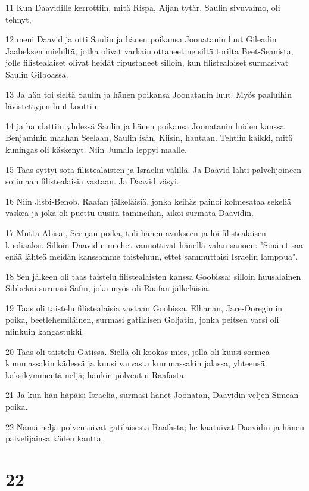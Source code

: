 \par 11 Kun Daavidille kerrottiin, mitä Rispa, Aijan tytär, Saulin sivuvaimo, oli tehnyt,
\par 12 meni Daavid ja otti Saulin ja hänen poikansa Joonatanin luut Gileadin Jaabeksen miehiltä, jotka olivat varkain ottaneet ne siltä torilta Beet-Seanista, jolle filistealaiset olivat heidät ripustaneet silloin, kun filistealaiset surmasivat Saulin Gilboassa.
\par 13 Ja hän toi sieltä Saulin ja hänen poikansa Joonatanin luut. Myös paaluihin lävistettyjen luut koottiin
\par 14 ja haudattiin yhdessä Saulin ja hänen poikansa Joonatanin luiden kanssa Benjaminin maahan Seelaan, Saulin isän, Kiisin, hautaan. Tehtiin kaikki, mitä kuningas oli käskenyt. Niin Jumala leppyi maalle.
\par 15 Taas syttyi sota filistealaisten ja Israelin välillä. Ja Daavid lähti palvelijoineen sotimaan filistealaisia vastaan. Ja Daavid väsyi.
\par 16 Niin Jisbi-Benob, Raafan jälkeläisiä, jonka keihäs painoi kolmesataa sekeliä vaskea ja joka oli puettu uusiin tamineihin, aikoi surmata Daavidin.
\par 17 Mutta Abisai, Serujan poika, tuli hänen avukseen ja löi filistealaisen kuoliaaksi. Silloin Daavidin miehet vannottivat hänellä valan sanoen: "Sinä et saa enää lähteä meidän kanssamme taisteluun, ettet sammuttaisi Israelin lamppua".
\par 18 Sen jälkeen oli taas taistelu filistealaisten kanssa Goobissa: silloin huusalainen Sibbekai surmasi Safin, joka myös oli Raafan jälkeläisiä.
\par 19 Taas oli taistelu filistealaisia vastaan Goobissa. Elhanan, Jare-Ooregimin poika, beetlehemiläinen, surmasi gatilaisen Goljatin, jonka peitsen varsi oli niinkuin kangastukki.
\par 20 Taas oli taistelu Gatissa. Siellä oli kookas mies, jolla oli kuusi sormea kummassakin kädessä ja kuusi varvasta kummassakin jalassa, yhteensä kaksikymmentä neljä; hänkin polveutui Raafasta.
\par 21 Ja kun hän häpäisi Israelia, surmasi hänet Joonatan, Daavidin veljen Simean poika.
\par 22 Nämä neljä polveutuivat gatilaisesta Raafasta; he kaatuivat Daavidin ja hänen palvelijainsa käden kautta.

\chapter{22}

